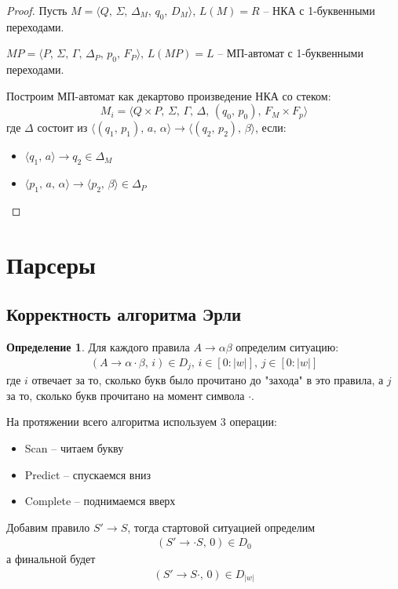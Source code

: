 \documentclass[a4paper,12pt]{article}
\theoremstyle{plain}
\theoremstyle{definition}
\newtheorem{definition}{Определение}[subsection]
\theoremstyle{remark}
\begin{document}
\begin{proof}
	Пусть $M = \langle Q,\, \Sigma,\, \Delta_M,\, q_0,\, D_M\rangle,\, L(M) = R$ -- НКА с 1-буквенными переходами.

	$MP = \langle P,\, \Sigma,\, \Gamma,\, \Delta_P,\, p_0,\, F_P\rangle,\, L(MP) = L$ -- МП-автомат с 1-буквенными переходами.

	Построим МП-автомат как декартово произведение НКА со стеком:
	\[
		M_i = \langle Q \times P,\, \Sigma,\, \Gamma,\, \Delta,\, (q_0,\, p_0),\, F_M \times F_p\rangle
	\]
	где $\Delta$ состоит из $\langle(q_1,\, p_1),\, a,\,\alpha\rangle \to\langle (q_2,\, p_2),\, \beta\rangle$, если:
	\begin{itemize}
		\item $\langle q_1,\, a\rangle \to q_2 \in \Delta_M$
		\item $\langle p_1,\,a,\,\alpha\rangle\to\langle p_2,\, \beta\rangle \in \Delta_P$
	\end{itemize}
\end{proof}

\section{Парсеры}
\subsection{Корректность алгоритма Эрли}
\begin{definition}
	Для каждого правила $A \to \alpha\beta$ определим ситуацию:
	\begin{align*}
		(A \to \alpha\cdot\beta,\, i) \in D_j,\, i \in [0 : \vert w\vert],\, j \in [0 : \vert w\vert]
	\end{align*}
	где $i$ отвечает за то, сколько букв было прочитано до "захода" в это правила, а $j$ за то, сколько букв прочитано на момент символа $\cdot$.
\end{definition}

На протяжении всего алгоритма используем 3 операции:
\begin{itemize}
	\item Scan -- читаем букву
	\item Predict -- спускаемся вниз
	\item Complete -- поднимаемся вверх
\end{itemize}

Добавим правило $S' \to S$, тогда стартовой ситуацией определим
\begin{align*}
	(S' \to \cdot S,\, 0) \in D_0
\end{align*}
а финальной будет
\begin{align*}
	(S' \to S\cdot,\, 0) \in D_{\vert w\vert}
\end{align*}
\end{document}
